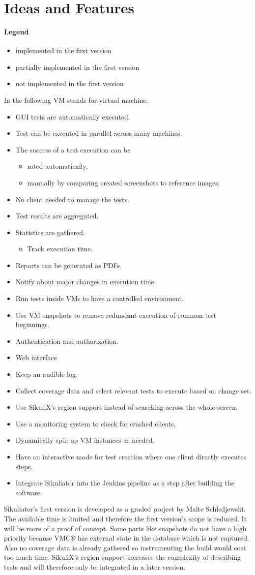 \documentclass[a4paper,twocolumn]{article}
\newcommand{\VMC}[0]{VMC®}
\newcommand{\Sik}[0]{Sikuliator}
\newcommand{\notImplemented}[0]{\item[$\times$] }
\newcommand{\partiallyImplemented}[0]{\item[$\boxdot$] }
\newcommand{\implemented}[0]{\item[\checkmark] }
\begin{document}
\section{Ideas and Features}
\paragraph{Legend}
\begin{itemize}
	\implemented implemented in the first version
	\partiallyImplemented partially implemented in the first version
	\notImplemented not implemented in the first version
\end{itemize}
	
	In the following VM stands for virtual machine.
\begin{itemize}
	\implemented GUI tests are automatically executed.
	\implemented Test can be executed in parallel across many machines.
	\partiallyImplemented The success of a test execution can be
	\begin{itemize}
		\implemented rated automatically,
		\notImplemented manually by comparing created screenshots to reference images.
	\end{itemize}
	\implemented No client needed to manage the tests.
	\implemented Test results are aggregated.
	\partiallyImplemented Statistics are gathered.
	\begin{itemize}
		\implemented Track execution time.
	\end{itemize}
	\notImplemented Reports can be generated as PDFs.
	\notImplemented Notify about major changes in execution time.
	\implemented Run tests inside VMs to have a controlled environment.
	\notImplemented Use VM snapshots to remove redundant execution of common test beginnings.
	\notImplemented Authentication and authorization.
	\partiallyImplemented Web interface
	\notImplemented Keep an audible log.
	\notImplemented Collect coverage data and select relevant tests to execute based on change set.
	\notImplemented Use SikuliX's region support instead of searching across the whole screen.
	\notImplemented Use a monitoring system to check for crashed clients.
	\notImplemented Dynamically spin up VM instances as needed.
	\notImplemented Have an interactive mode for test creation where one client directly executes steps.
	\notImplemented Integrate \Sik{} into the Jenkins\cite{Jenkins} pipeline as a step after building the software.
\end{itemize}

\Sik{}'s first version is developed as a graded project by Malte Schledjewski.
The available time is limited and therefore the first version's scope is reduced.
It will be more of a proof of concept.
Some parts like snapshots do not have a high priority because \VMC{} has external state in the database which is not captured. 
Also no coverage data is already gathered so instrumenting the build would cost too much time. 
SikuliX's region support increases the complexity of describing tests and will therefore only be integrated in a later version.
\end{document}
